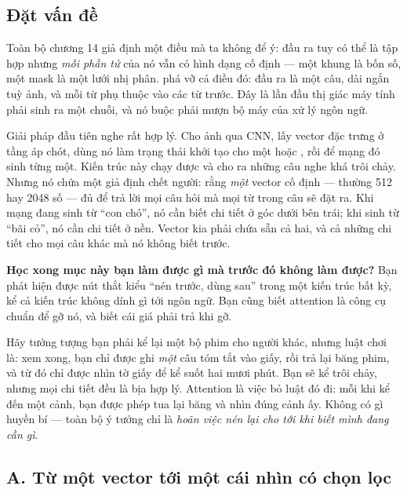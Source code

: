 \documentclass[../../../deep_learning.tex]{subfiles}
\begin{document}
\subsection{Đặt vấn đề}
Toàn bộ chương 14 giả định một điều mà ta không để ý: đầu ra tuy có thể là tập hợp nhưng \emph{mỗi phần tử} của nó vẫn có hình dạng cố định --- một khung là bốn số, một mask là một lưới nhị phân.  phá vỡ cả điều đó: đầu ra là một câu, dài ngắn tuỳ ảnh, và mỗi từ phụ thuộc vào các từ trước. Đây là lần đầu thị giác máy tính phải sinh ra một chuỗi, và nó buộc phải mượn bộ máy của xử lý ngôn ngữ.

Giải pháp đầu tiên nghe rất hợp lý. Cho ảnh qua CNN, lấy vector đặc trưng ở tầng áp chót, dùng nó làm trạng thái khởi tạo cho một  hoặc  \cite{hochreiter1997lstm}, rồi để mạng đó sinh từng  một. Kiến trúc này chạy được và cho ra những câu nghe khá trôi chảy. Nhưng nó chứa một giả định chết người: rằng \emph{một} vector cố định --- thường 512 hay 2048 số --- đủ để trả lời mọi câu hỏi mà mọi từ trong câu sẽ đặt ra. Khi mạng đang sinh từ ``con chó'', nó cần biết chi tiết ở góc dưới bên trái; khi sinh từ ``bãi cỏ'', nó cần chi tiết ở nền. Vector kia phải chứa sẵn cả hai, và cả những chi tiết cho mọi câu khác mà nó không biết trước.

\textbf{Học xong mục này bạn làm được gì mà trước đó không làm được?} Bạn phát hiện được nút thắt kiểu ``nén trước, dùng sau'' trong một kiến trúc bất kỳ, kể cả kiến trúc không dính gì tới ngôn ngữ. Bạn cũng biết attention là công cụ chuẩn để gỡ nó, và biết cái giá phải trả khi gỡ.

\begin{trucgiac}
Hãy tưởng tượng bạn phải kể lại một bộ phim cho người khác, nhưng luật chơi là: xem xong, bạn chỉ được ghi \emph{một} câu tóm tắt vào giấy, rồi trả lại băng phim, và từ đó chỉ được nhìn tờ giấy để kể suốt hai mươi phút. Bạn sẽ kể trôi chảy, nhưng mọi chi tiết đều là bịa hợp lý. Attention là việc bỏ luật đó đi: mỗi khi kể đến một cảnh, bạn được phép tua lại băng và nhìn đúng cảnh ấy. Không có gì huyền bí --- toàn bộ ý tưởng chỉ là \emph{hoãn việc nén lại cho tới khi biết mình đang cần gì}.
\end{trucgiac}

\subsection{A. Từ một vector tới một cái nhìn có chọn lọc}
\end{document}
